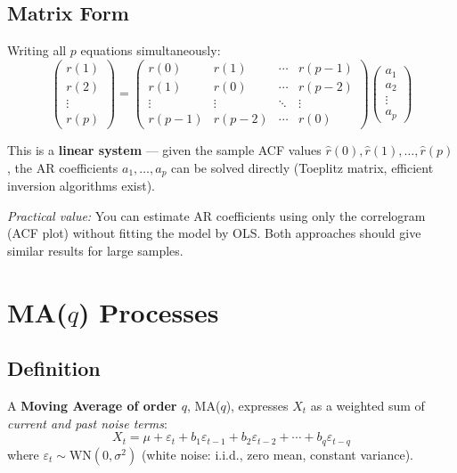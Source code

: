 \documentclass[11pt]{article}
\begin{document}
\subsection{Matrix Form}
Writing all $p$ equations simultaneously:
\[
\begin{pmatrix} r(1) \\ r(2) \\ \vdots \\ r(p) \end{pmatrix}
=
\begin{pmatrix}
  r(0)   & r(1)   & \cdots & r(p-1) \\
  r(1)   & r(0)   & \cdots & r(p-2) \\
  \vdots & \vdots & \ddots & \vdots \\
  r(p-1) & r(p-2) & \cdots & r(0)
\end{pmatrix}
\begin{pmatrix} a_1 \\ a_2 \\ \vdots \\ a_p \end{pmatrix}
\]

This is a \textbf{linear system} --- given the sample ACF values $\hat{r}(0),
\hat{r}(1), \ldots, \hat{r}(p)$, the AR coefficients $a_1, \ldots, a_p$ can be
solved directly (Toeplitz matrix, efficient inversion algorithms exist).

\textit{Practical value:} You can estimate AR coefficients using only the
correlogram (ACF plot) without fitting the model by OLS. Both approaches
should give similar results for large samples.


\section{MA($q$) Processes}

\subsection{Definition}
A \textbf{Moving Average of order $q$}, MA($q$), expresses $X_t$ as a weighted
sum of \emph{current and past noise terms}:
\[
X_t = \mu + \varepsilon_t + b_1 \varepsilon_{t-1} + b_2 \varepsilon_{t-2}
      + \cdots + b_q \varepsilon_{t-q}
\]
where $\varepsilon_t \sim \text{WN}(0, \sigma^2)$ (white noise: i.i.d., zero mean,
constant variance).
\end{document}
